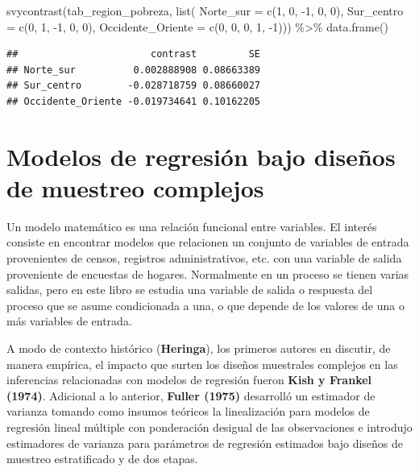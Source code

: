 \documentclass[
  12pt,
]{book}
\newenvironment{Shaded}{\begin{snugshade}}{\end{snugshade}}
\newcommand{\AttributeTok}[1]{\textcolor[rgb]{0.77,0.63,0.00}{#1}}
\newcommand{\DecValTok}[1]{\textcolor[rgb]{0.00,0.00,0.81}{#1}}
\newcommand{\FunctionTok}[1]{\textcolor[rgb]{0.00,0.00,0.00}{#1}}
\newcommand{\NormalTok}[1]{#1}
\newcommand{\SpecialCharTok}[1]{\textcolor[rgb]{0.00,0.00,0.00}{#1}}
\begin{document}
\begin{Shaded}
\begin{Highlighting}[]
\FunctionTok{svycontrast}\NormalTok{(tab\_region\_pobreza, }\FunctionTok{list}\NormalTok{(}
                \AttributeTok{Norte\_sur =} \FunctionTok{c}\NormalTok{(}\DecValTok{1}\NormalTok{, }\DecValTok{0}\NormalTok{, }\SpecialCharTok{{-}}\DecValTok{1}\NormalTok{, }\DecValTok{0}\NormalTok{, }\DecValTok{0}\NormalTok{),}
                \AttributeTok{Sur\_centro =} \FunctionTok{c}\NormalTok{(}\DecValTok{0}\NormalTok{, }\DecValTok{1}\NormalTok{, }\SpecialCharTok{{-}}\DecValTok{1}\NormalTok{, }\DecValTok{0}\NormalTok{, }\DecValTok{0}\NormalTok{),}
                \AttributeTok{Occidente\_Oriente =} \FunctionTok{c}\NormalTok{(}\DecValTok{0}\NormalTok{, }\DecValTok{0}\NormalTok{, }\DecValTok{0}\NormalTok{, }\DecValTok{1}\NormalTok{, }\SpecialCharTok{{-}}\DecValTok{1}\NormalTok{))) }\SpecialCharTok{\%\textgreater{}\%} \FunctionTok{data.frame}\NormalTok{()}
\end{Highlighting}
\end{Shaded}

\begin{verbatim}
##                       contrast         SE
## Norte_sur          0.002888908 0.08663389
## Sur_centro        -0.028718759 0.08660027
## Occidente_Oriente -0.019734641 0.10162205
\end{verbatim}

\hypertarget{modelos-de-regresiuxf3n-bajo-diseuxf1os-de-muestreo-complejos}{%
\chapter{Modelos de regresión bajo diseños de muestreo complejos}\label{modelos-de-regresiuxf3n-bajo-diseuxf1os-de-muestreo-complejos}}

Un modelo matemático es una relación funcional entre variables. El interés consiste en encontrar modelos que relacionen un conjunto de variables de entrada provenientes de censos, registros administrativos, etc. con una variable de salida proveniente de encuestas de hogares. Normalmente en un proceso se tienen varias salidas, pero en este libro se estudia una variable de salida o respuesta del proceso que se asume condicionada a una, o que depende de los valores de una o más variables de entrada.

A modo de contexto histórico (\textbf{Heringa}), los primeros autores en discutir, de manera empírica, el impacto que surten los diseños muestrales complejos en las inferencias relacionadas con modelos de regresión fueron \textbf{Kish y Frankel (1974)}. Adicional a lo anterior, \textbf{Fuller (1975)} desarrolló un estimador de varianza tomando como insumos teóricos la linealización para modelos de regresión lineal múltiple con ponderación desigual de las observaciones e introdujo estimadores de varianza para parámetros de regresión estimados bajo diseños de muestreo estratificado y de dos etapas.
\end{document}
